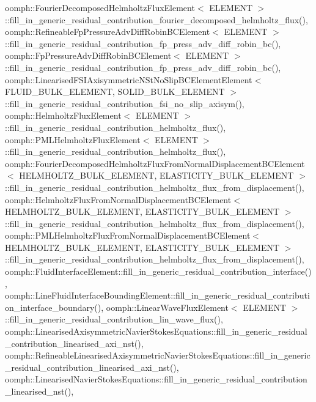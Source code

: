 oomph\+::\+Fourier\+Decomposed\+Helmholtz\+Flux\+Element$<$ E\+L\+E\+M\+E\+N\+T $>$\+::fill\+\_\+in\+\_\+generic\+\_\+residual\+\_\+contribution\+\_\+fourier\+\_\+decomposed\+\_\+helmholtz\+\_\+flux(), oomph\+::\+Refineable\+Fp\+Pressure\+Adv\+Diff\+Robin\+B\+C\+Element$<$ E\+L\+E\+M\+E\+N\+T $>$\+::fill\+\_\+in\+\_\+generic\+\_\+residual\+\_\+contribution\+\_\+fp\+\_\+press\+\_\+adv\+\_\+diff\+\_\+robin\+\_\+bc(), oomph\+::\+Fp\+Pressure\+Adv\+Diff\+Robin\+B\+C\+Element$<$ E\+L\+E\+M\+E\+N\+T $>$\+::fill\+\_\+in\+\_\+generic\+\_\+residual\+\_\+contribution\+\_\+fp\+\_\+press\+\_\+adv\+\_\+diff\+\_\+robin\+\_\+bc(), oomph\+::\+Linearised\+F\+S\+I\+Axisymmetric\+N\+St\+No\+Slip\+B\+C\+Element\+Element$<$ F\+L\+U\+I\+D\+\_\+\+B\+U\+L\+K\+\_\+\+E\+L\+E\+M\+E\+N\+T, S\+O\+L\+I\+D\+\_\+\+B\+U\+L\+K\+\_\+\+E\+L\+E\+M\+E\+N\+T $>$\+::fill\+\_\+in\+\_\+generic\+\_\+residual\+\_\+contribution\+\_\+fsi\+\_\+no\+\_\+slip\+\_\+axisym(), oomph\+::\+Helmholtz\+Flux\+Element$<$ E\+L\+E\+M\+E\+N\+T $>$\+::fill\+\_\+in\+\_\+generic\+\_\+residual\+\_\+contribution\+\_\+helmholtz\+\_\+flux(), oomph\+::\+P\+M\+L\+Helmholtz\+Flux\+Element$<$ E\+L\+E\+M\+E\+N\+T $>$\+::fill\+\_\+in\+\_\+generic\+\_\+residual\+\_\+contribution\+\_\+helmholtz\+\_\+flux(), oomph\+::\+Fourier\+Decomposed\+Helmholtz\+Flux\+From\+Normal\+Displacement\+B\+C\+Element$<$ H\+E\+L\+M\+H\+O\+L\+T\+Z\+\_\+\+B\+U\+L\+K\+\_\+\+E\+L\+E\+M\+E\+N\+T, E\+L\+A\+S\+T\+I\+C\+I\+T\+Y\+\_\+\+B\+U\+L\+K\+\_\+\+E\+L\+E\+M\+E\+N\+T $>$\+::fill\+\_\+in\+\_\+generic\+\_\+residual\+\_\+contribution\+\_\+helmholtz\+\_\+flux\+\_\+from\+\_\+displacement(), oomph\+::\+Helmholtz\+Flux\+From\+Normal\+Displacement\+B\+C\+Element$<$ H\+E\+L\+M\+H\+O\+L\+T\+Z\+\_\+\+B\+U\+L\+K\+\_\+\+E\+L\+E\+M\+E\+N\+T, E\+L\+A\+S\+T\+I\+C\+I\+T\+Y\+\_\+\+B\+U\+L\+K\+\_\+\+E\+L\+E\+M\+E\+N\+T $>$\+::fill\+\_\+in\+\_\+generic\+\_\+residual\+\_\+contribution\+\_\+helmholtz\+\_\+flux\+\_\+from\+\_\+displacement(), oomph\+::\+P\+M\+L\+Helmholtz\+Flux\+From\+Normal\+Displacement\+B\+C\+Element$<$ H\+E\+L\+M\+H\+O\+L\+T\+Z\+\_\+\+B\+U\+L\+K\+\_\+\+E\+L\+E\+M\+E\+N\+T, E\+L\+A\+S\+T\+I\+C\+I\+T\+Y\+\_\+\+B\+U\+L\+K\+\_\+\+E\+L\+E\+M\+E\+N\+T $>$\+::fill\+\_\+in\+\_\+generic\+\_\+residual\+\_\+contribution\+\_\+helmholtz\+\_\+flux\+\_\+from\+\_\+displacement(), oomph\+::\+Fluid\+Interface\+Element\+::fill\+\_\+in\+\_\+generic\+\_\+residual\+\_\+contribution\+\_\+interface(), oomph\+::\+Line\+Fluid\+Interface\+Bounding\+Element\+::fill\+\_\+in\+\_\+generic\+\_\+residual\+\_\+contribution\+\_\+interface\+\_\+boundary(), oomph\+::\+Linear\+Wave\+Flux\+Element$<$ E\+L\+E\+M\+E\+N\+T $>$\+::fill\+\_\+in\+\_\+generic\+\_\+residual\+\_\+contribution\+\_\+lin\+\_\+wave\+\_\+flux(), oomph\+::\+Linearised\+Axisymmetric\+Navier\+Stokes\+Equations\+::fill\+\_\+in\+\_\+generic\+\_\+residual\+\_\+contribution\+\_\+linearised\+\_\+axi\+\_\+nst(), oomph\+::\+Refineable\+Linearised\+Axisymmetric\+Navier\+Stokes\+Equations\+::fill\+\_\+in\+\_\+generic\+\_\+residual\+\_\+contribution\+\_\+linearised\+\_\+axi\+\_\+nst(), oomph\+::\+Linearised\+Navier\+Stokes\+Equations\+::fill\+\_\+in\+\_\+generic\+\_\+residual\+\_\+contribution\+\_\+linearised\+\_\+nst(), 